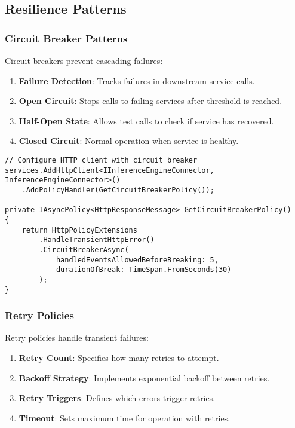 \subsection{Resilience Patterns}

\subsubsection{Circuit Breaker Patterns}

Circuit breakers prevent cascading failures:

\begin{enumerate}
   \item \textbf{Failure Detection}: Tracks failures in downstream service calls.
   \item \textbf{Open Circuit}: Stops calls to failing services after threshold is reached.
   \item \textbf{Half-Open State}: Allows test calls to check if service has recovered.
   \item \textbf{Closed Circuit}: Normal operation when service is healthy.
\end{enumerate}

\begin{verbatim}
// Configure HTTP client with circuit breaker
services.AddHttpClient<IInferenceEngineConnector, InferenceEngineConnector>()
    .AddPolicyHandler(GetCircuitBreakerPolicy());
    
private IAsyncPolicy<HttpResponseMessage> GetCircuitBreakerPolicy()
{
    return HttpPolicyExtensions
        .HandleTransientHttpError()
        .CircuitBreakerAsync(
            handledEventsAllowedBeforeBreaking: 5,
            durationOfBreak: TimeSpan.FromSeconds(30)
        );
}
\end{verbatim}

\subsubsection{Retry Policies}

Retry policies handle transient failures:

\begin{enumerate}
   \item \textbf{Retry Count}: Specifies how many retries to attempt.
   \item \textbf{Backoff Strategy}: Implements exponential backoff between retries.
   \item \textbf{Retry Triggers}: Defines which errors trigger retries.
   \item \textbf{Timeout}: Sets maximum time for operation with retries.
\end{enumerate}

